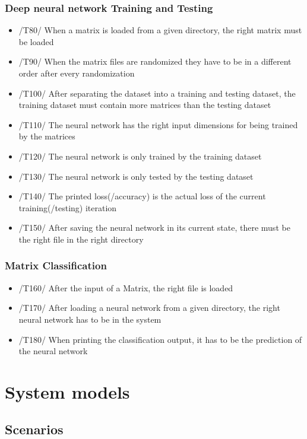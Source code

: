 \documentclass[parskip=full]{scrartcl}
\begin{document}
	\subsubsection{Deep \gls{neural network} Training and Testing}
		\begin{itemize}
		\item /T80/ When a matrix is loaded from a given directory, the right matrix must be loaded
		\item /T90/ When the matrix files are randomized they have to be in a different order after every randomization
		\item /T100/ After separating the dataset into a training and testing dataset, the training dataset must contain more matrices than the testing dataset
		\item /T110/ The \gls{neural network} has the right input dimensions for being trained by the matrices
		\item /T120/ The \gls{neural network} is only trained by the training dataset
		\item /T130/ The \gls{neural network} is only tested by the testing dataset
		\item /T140/ The printed loss(/accuracy) is the actual loss of the current training(/testing) iteration 
		\item /T150/ After saving the \gls{neural network} in its current state, there must be the right file in the right directory
		\end{itemize}
	\subsubsection{Matrix Classification}
		\begin{itemize}
		\item /T160/ After the input of a Matrix, the right file is loaded
		\item /T170/ After loading a \gls{neural network} from a given directory, the right \gls{neural network} has to be in the system
		\item /T180/ When printing the classification output, it has to be the prediction of the \gls{neural network}
		\end{itemize}
\newpage
\section{System models}
\subsection{Scenarios}
\end{document}
